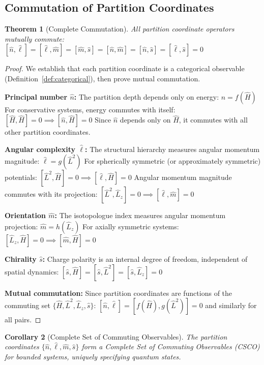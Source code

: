 \documentclass[twocolumn,10pt]{article}
\newtheorem{theorem}{Theorem}[section]
\newtheorem{corollary}[theorem]{Corollary}
\begin{document}
\subsection{Commutation of Partition Coordinates}

\begin{theorem}[Complete Commutation]
\label{thm:commutation}
All partition coordinate operators mutually commute:
$
[\hat{n}, \hat{\ell}] = [\hat{\ell}, \hat{m}] = [\hat{m}, \hat{s}] = [\hat{n}, \hat{m}] = [\hat{n}, \hat{s}] = [\hat{\ell}, \hat{s}] = 0
$
\end{theorem}

\begin{proof}
We establish that each partition coordinate is a categorical observable (Definition~\ref{def:categorical}), then prove mutual commutation.

\textbf{Principal number $\hat{n}$:} The partition depth depends only on energy:
$
\hat{n} = f(\hat{H})
$
For conservative systems, energy commutes with itself:
$
[\hat{H}, \hat{H}] = 0 \implies [\hat{n}, \hat{H}] = 0
$
Since $\hat{n}$ depends only on $\hat{H}$, it commutes with all other partition coordinates.

\textbf{Angular complexity $\hat{\ell}$:} The structural hierarchy measures angular momentum magnitude:
$
\hat{\ell} = g(\hat{L}^2)
$
For spherically symmetric (or approximately symmetric) potentials:
$
[\hat{L}^2, \hat{H}] = 0 \implies [\hat{\ell}, \hat{H}] = 0
$
Angular momentum magnitude commutes with its projection:
$
[\hat{L}^2, \hat{L}_z] = 0 \implies [\hat{\ell}, \hat{m}] = 0
$

\textbf{Orientation $\hat{m}$:} The isotopologue index measures angular momentum projection:
$
\hat{m} = h(\hat{L}_z)
$
For axially symmetric systems:
$
[\hat{L}_z, \hat{H}] = 0 \implies [\hat{m}, \hat{H}] = 0
$

\textbf{Chirality $\hat{s}$:} Charge polarity is an internal degree of freedom, independent of spatial dynamics:
$
[\hat{s}, \hat{H}] = [\hat{s}, \hat{L}^2] = [\hat{s}, \hat{L}_z] = 0
$

\textbf{Mutual commutation:} Since partition coordinates are functions of the commuting set $\{\hat{H}, \hat{L}^2, \hat{L}_z, \hat{s}\}$:
$
[\hat{n}, \hat{\ell}] = [f(\hat{H}), g(\hat{L}^2)] = 0
$
and similarly for all pairs.
\end{proof}

\begin{corollary}[Complete Set of Commuting Observables]
\label{cor:csco}
The partition coordinates $\{\hat{n}, \hat{\ell}, \hat{m}, \hat{s}\}$ form a Complete Set of Commuting Observables (CSCO) for bounded systems, uniquely specifying quantum states.
\end{corollary}
\end{document}
